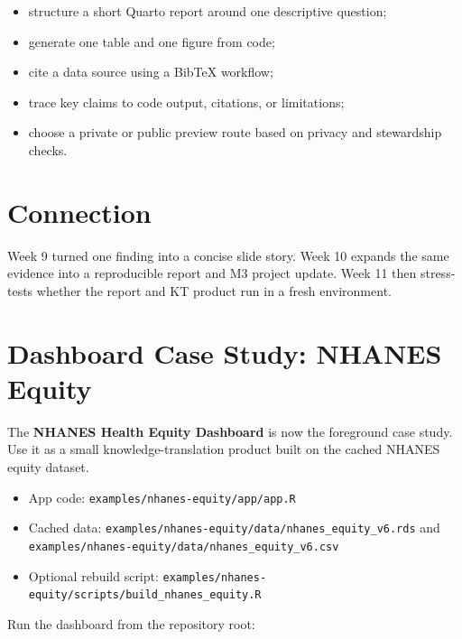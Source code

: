 \documentclass[
  letterpaper,
  DIV=11,
  numbers=noendperiod,
  oneside]{scrreprt}
\providecommand{\tightlist}{%
  \setlength{\itemsep}{0pt}\setlength{\parskip}{0pt}}
\begin{document}
\begin{itemize}
\tightlist
\item
  structure a short Quarto report around one descriptive question;
\item
  generate one table and one figure from code;
\item
  cite a data source using a BibTeX workflow;
\item
  trace key claims to code output, citations, or limitations;
\item
  choose a private or public preview route based on privacy and
  stewardship checks.
\end{itemize}

\section*{Connection}\label{connection-9}


Week 9 turned one finding into a concise slide story. Week 10 expands
the same evidence into a reproducible report and M3 project update. Week
11 then stress-tests whether the report and KT product run in a fresh
environment.

\section*{Dashboard Case Study: NHANES
Equity}\label{dashboard-case-study-nhanes-equity-2}


The \textbf{NHANES Health Equity Dashboard} is now the foreground case
study. Use it as a small knowledge-translation product built on the
cached NHANES equity dataset.

\begin{itemize}
\tightlist
\item
  App code: \texttt{examples/nhanes-equity/app/app.R}
\item
  Cached data:
  \texttt{examples/nhanes-equity/data/nhanes\_equity\_v6.rds} and
  \texttt{examples/nhanes-equity/data/nhanes\_equity\_v6.csv}
\item
  Optional rebuild script:
  \texttt{examples/nhanes-equity/scripts/build\_nhanes\_equity.R}
\end{itemize}

Run the dashboard from the repository root:
\end{document}
